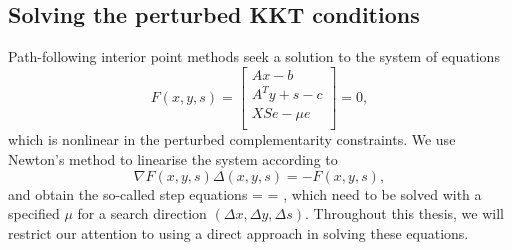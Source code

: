 

%
%
\subsection{Solving the perturbed KKT conditions}

Path-following interior point methods seek a solution 
to the system of equations
\[
F(x,y,s) = \left[
  \begin{array}{c}
    Ax-b \\
    A^Ty+s-c \\
    XSe - \mu e \\
  \end{array} \right] = 0,
\]
which is nonlinear in the perturbed complementarity constraints.
We use Newton's method to linearise the system according to
\[
\nabla F(x,y,s) \Delta(x,y,s) = -F(x,y,s),
\]
and obtain the so-called step equations
%
\be \label{eq:NewtonSystem}
 =
 =
\left[ \begin{array}{c}
    \xi_b \\ \xi_c \\ \xi_\mu
   \end{array} \right],
\ee
%
which need to be solved with a specified $\mu$ for a search direction
$(\Delta x, \Delta y, \Delta s)$. Throughout this thesis, we will 
restrict our attention to using a direct approach in solving these
equations.

